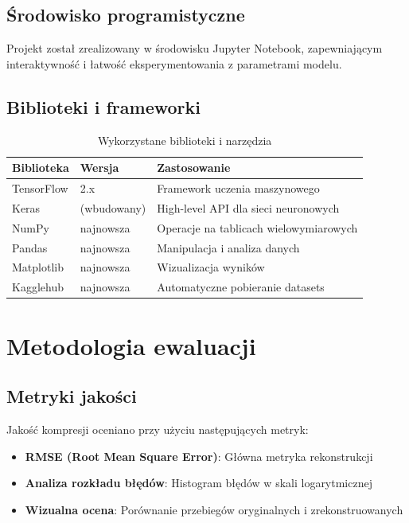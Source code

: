 \documentclass[12pt,a4paper]{article}
\begin{document}
\subsection{Środowisko programistyczne}

Projekt został zrealizowany w środowisku Jupyter Notebook, zapewniającym interaktywność i łatwość eksperymentowania z parametrami modelu.

\subsection{Biblioteki i frameworki}

\begin{table}[H]
\centering
\begin{tabular}{@{}lll@{}}
\toprule
\textbf{Biblioteka} & \textbf{Wersja} & \textbf{Zastosowanie} \\
\midrule
TensorFlow & 2.x & Framework uczenia maszynowego \\
Keras & (wbudowany) & High-level API dla sieci neuronowych \\
NumPy & najnowsza & Operacje na tablicach wielowymiarowych \\
Pandas & najnowsza & Manipulacja i analiza danych \\
Matplotlib & najnowsza & Wizualizacja wyników \\
Kagglehub & najnowsza & Automatyczne pobieranie datasets \\
\bottomrule
\end{tabular}
\caption{Wykorzystane biblioteki i narzędzia}
\end{table}

\section{Metodologia ewaluacji}

\subsection{Metryki jakości}

Jakość kompresji oceniano przy użyciu następujących metryk:

\begin{itemize}
    \item \textbf{RMSE (Root Mean Square Error)}: Główna metryka rekonstrukcji
    \item \textbf{Analiza rozkładu błędów}: Histogram błędów w skali logarytmicznej
    \item \textbf{Wizualna ocena}: Porównanie przebiegów oryginalnych i zrekonstruowanych
\end{itemize}
\end{document}
